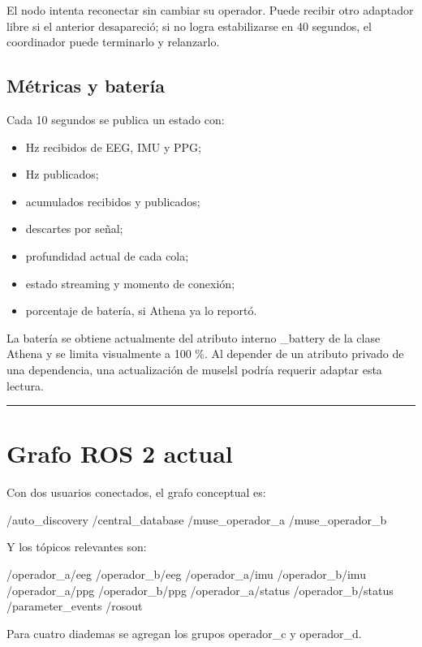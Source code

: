 \documentclass[11pt,a4paper]{article}
\begin{document}
El nodo intenta reconectar sin cambiar su operador. Puede recibir otro adaptador libre si
el anterior desapareció; si no logra estabilizarse en 40 segundos, el coordinador puede
terminarlo y relanzarlo.

\subsection{Métricas y batería}

Cada 10 segundos se publica un estado con:

\begin{itemize}
\item Hz recibidos de EEG, IMU y PPG;
\item Hz publicados;
\item acumulados recibidos y publicados;
\item descartes por señal;
\item profundidad actual de cada cola;
\item estado streaming y momento de conexión;
\item porcentaje de batería, si Athena ya lo reportó.
\end{itemize}

La batería se obtiene actualmente del atributo interno {\ttfamily\small \_battery} de la clase Athena y se limita visualmente a 100 \%. Al depender de un atributo privado de una dependencia, una actualización de {\ttfamily\small muselsl} podría requerir adaptar esta lectura.

\medskip\hrule\medskip

\section{Grafo ROS 2 actual}

Con dos usuarios conectados, el grafo conceptual es:

\begin{MuseCode}
/auto_discovery
/central_database
/muse_operador_a
/muse_operador_b
\end{MuseCode}

Y los tópicos relevantes son:

\begin{MuseCode}
/operador_a/eeg      /operador_b/eeg
/operador_a/imu      /operador_b/imu
/operador_a/ppg      /operador_b/ppg
/operador_a/status   /operador_b/status
/parameter_events
/rosout
\end{MuseCode}

Para cuatro diademas se agregan los grupos {\ttfamily\small operador\_c} y {\ttfamily\small operador\_d}.
\end{document}
